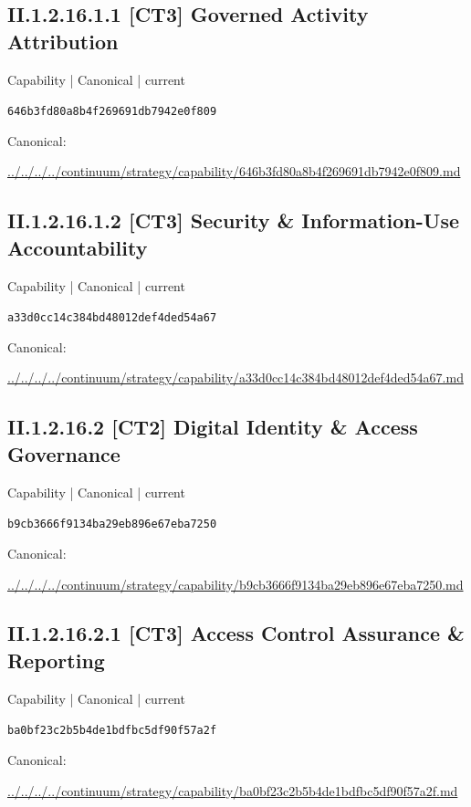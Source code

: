 \documentclass[10pt,a4paper]{article}
\begin{document}
\subsection*{II.1.2.16.1.1 [CT3] Governed Activity Attribution}
\label{element-646b3fd80a8b4f269691db7942e0f809}
{\small Capability | Canonical | current}\par
\texttt{646b3fd80a8b4f269691db7942e0f809}\par
Canonical: \par
{\footnotesize\url{../../../../continuum/strategy/capability/646b3fd80a8b4f269691db7942e0f809.md}}\par
\subsection*{II.1.2.16.1.2 [CT3] Security \& Information-Use Accountability}
\label{element-a33d0cc14c384bd48012def4ded54a67}
{\small Capability | Canonical | current}\par
\texttt{a33d0cc14c384bd48012def4ded54a67}\par
Canonical: \par
{\footnotesize\url{../../../../continuum/strategy/capability/a33d0cc14c384bd48012def4ded54a67.md}}\par
\subsection*{II.1.2.16.2 [CT2] Digital Identity \& Access Governance}
\label{element-b9cb3666f9134ba29eb896e67eba7250}
{\small Capability | Canonical | current}\par
\texttt{b9cb3666f9134ba29eb896e67eba7250}\par
Canonical: \par
{\footnotesize\url{../../../../continuum/strategy/capability/b9cb3666f9134ba29eb896e67eba7250.md}}\par
\subsection*{II.1.2.16.2.1 [CT3] Access Control Assurance \& Reporting}
\label{element-ba0bf23c2b5b4de1bdfbc5df90f57a2f}
{\small Capability | Canonical | current}\par
\texttt{ba0bf23c2b5b4de1bdfbc5df90f57a2f}\par
Canonical: \par
{\footnotesize\url{../../../../continuum/strategy/capability/ba0bf23c2b5b4de1bdfbc5df90f57a2f.md}}\par
\end{document}
